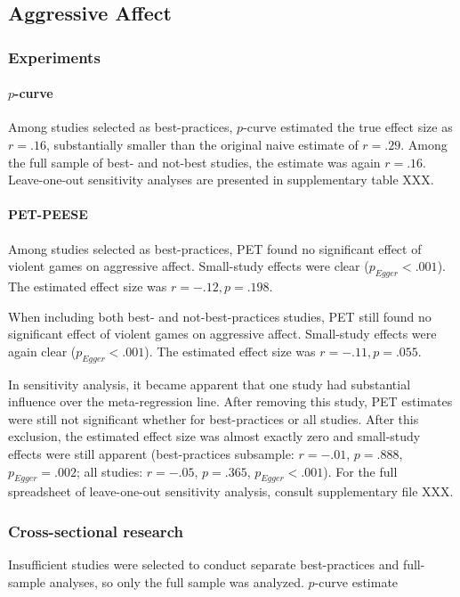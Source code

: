 \documentclass[man]{apa6}
\begin{document}
\subsection{Aggressive Affect}
\subsubsection{Experiments}
\paragraph{$p$-curve}
Among studies selected as best-practices, $p$-curve estimated the true effect size as $r = .16$, substantially smaller than the original naive estimate of $r = .29$. Among the full sample of best- and not-best studies, the estimate was again $r = .16$. Leave-one-out sensitivity analyses are presented in supplementary table XXX. 

\paragraph{PET-PEESE}
Among studies selected as best-practices, PET found no significant effect of violent games on aggressive affect. Small-study effects were clear ($p_{Egger} <.001$). The estimated effect size was $r = -.12, p = .198$.

When including both best- and not-best-practices studies, PET still found no significant effect of violent games on aggressive affect. Small-study effects were again clear ($p_{Egger} < .001$). The estimated effect size was $r = -.11, p = .055$.

In sensitivity analysis, it became apparent that one study \citep{Ballard:Weist:1996} had substantial influence over the meta-regression line. After removing this study, PET estimates were still not significant whether for best-practices or all studies. After this exclusion, the estimated effect size was almost exactly zero and small-study effects were still apparent (best-practices subsample: $r = -.01$, $p = .888$, $p_{Egger} = .002$; all studies: $r = -.05$, $p = .365$, $p_{Egger} < .001$). For the full spreadsheet of leave-one-out sensitivity analysis, consult supplementary file XXX.

\subsubsection{Cross-sectional research}
Insufficient studies were selected to conduct separate best-practices and full-sample analyses, so only the full sample was analyzed. $p$-curve estimate
\end{document}
